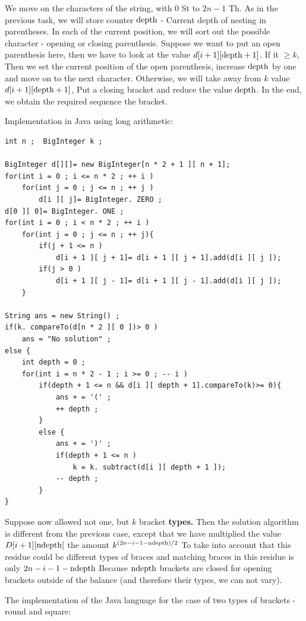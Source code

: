 We move on the characters of the string, with $0$ St to $2n-1$ Th. As in the previous task, we will store counter $\rm depth$ - Current depth of nesting in parentheses. In each of the current position, we will sort out the possible character - opening or closing parenthesis. Suppose we want to put an open parenthesis here, then we have to look at the value $d [i +1][\rm depth +1]$. If it $\ge k$, Then we set the current position of the open parenthesis, increase $\rm depth$ by one and move on to the next character. Otherwise, we will take away from $k$ value $d [i +1][\rm depth +1]$, Put a closing bracket and reduce the value $\rm depth$. In the end, we obtain the required sequence the bracket.

Implementation in Java using long arithmetic:

\begin{verbatim}
int n ;  BigInteger k ;
 
BigInteger d[][]= new BigInteger[n * 2 + 1 ][ n + 1];
for(int i = 0 ; i <= n * 2 ; ++ i )
    for(int j = 0 ; j <= n ; ++ j )
        d[i ][ j]= BigInteger. ZERO ;
d[0 ][ 0]= BigInteger. ONE ;
for(int i = 0 ; i < n * 2 ; ++ i )
    for(int j = 0 ; j <= n ; ++ j){
        if(j + 1 <= n )
            d[i + 1 ][ j + 1]= d[i + 1 ][ j + 1].add(d[i ][ j ]);
        if(j > 0 )
            d[i + 1 ][ j - 1]= d[i + 1 ][ j - 1].add(d[i ][ j ]);
    }
 
String ans = new String() ;
if(k. compareTo(d[n * 2 ][ 0 ])> 0 )
    ans = "No solution" ;
else {
    int depth = 0 ;
    for(int i = n * 2 - 1 ; i >= 0 ; -- i )
        if(depth + 1 <= n && d[i ][ depth + 1].compareTo(k)>= 0){
            ans + = '(' ;
            ++ depth ;
        }
        else {
            ans + = ')' ;
            if(depth + 1 <= n )
                k = k. subtract(d[i ][ depth + 1 ]);
            -- depth ;
        }
} 
\end{verbatim}
Suppose now allowed not one, but \textbf{$k$} bracket \textbf{types.} Then the solution algorithm is different from the previous case, except that we have multiplied the value $D [i +1][\rm ndepth]$ the amount $k ^ {(2n-i-1-\rm ndepth) / 2}$ To take into account that this residue could be different types of braces and matching braces in this residue is only $2n-i-1-\rm ndepth$ Because $\rm ndepth$ brackets are closed for opening brackets outside of the balance (and therefore their types, we can not vary).

The implementation of the Java language for the case of two types of brackets - round and square:

